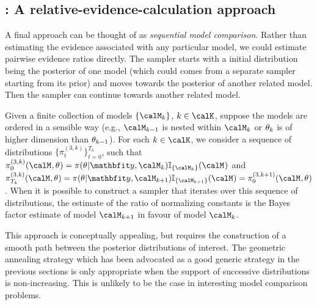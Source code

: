 \subsection{\smc[3]: A relative-evidence-calculation approach}
\label{sub:smc3: A relative-evidence-calculation approach}

A final approach can be thought of as \emph{sequential model comparison}.
Rather than estimating the evidence associated with any particular model, we
could estimate pairwise evidence ratios directly. The \smc sampler starts with
a initial distribution being the posterior of one model (which could comes
from a separate \smc sampler starting from its prior) and moves towards the
posterior of another related model. Then the sampler can continue towards
another related model.

Given a finite collection of models $\{\Mk\}$, $k\in\calK$, suppose the models
are ordered in a sensible way (e.g., $\Mk[k-1]$ is nested within $\Mk$ or
$\paramk$ is of higher dimension than $\paramk[k-1]$). For each
$k\in\calK$, we consider a sequence of distributions
$\{\pi_t^{(3,k)}\}_{t=0}^{T_k}$, such that $\pi_0^{(3,k)}(\Mk[],\paramk[]) =
\pi(\paramk[]|\data,\Mk) \mathbb{I}_{\{\Mk\}}(\Mk[])$ and $\pi_{T_k}^{(3,k)}(\Mk[],\paramk[]) =
\pi(\paramk[]|\data,\Mk[k+1]) \mathbb{I}_{\{\Mk[k+1]\}}(\Mk[]) = \pi_{0}^{(3,k+1)}(\Mk[],\paramk[])$.
When it is possible to construct a \smc sampler that iterates over this
sequence of distributions, the estimate of the ratio of normalizing constants
is the Bayes factor estimate of model $\Mk[k+1]$ in favour of model $\Mk$.

This approach is conceptually appealing, but requires the construction of a
smooth path between the posterior distributions of interest. The geometric
annealing strategy which has been advocated as a good generic strategy in the
previous sections is only appropriate when the support of successive
distributions is non-increasing. This is unlikely to be the case in
interesting model comparison problems.

